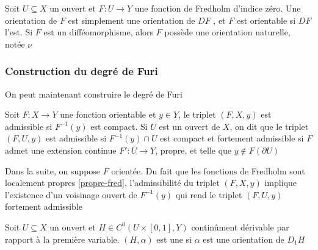 \documentclass[memoire.tex]{subfiles}
\begin{document}
\begin{definition}
    Soit $U\subseteq X$ un ouvert et $F: U\rightarrow Y$ une fonction de Fredholm d'indice zéro. Une \textcolor{color-def}{orientation} de $F$ est simplement une orientation de $DF$ , et $F$ est \textcolor{color-def}{orientable} si $DF$ l'est. Si $F$ est un difféomorphisme, alors $F$ possède une orientation naturelle, notée $\nu$
\end{definition}

\subsubsection{Construction du degré de Furi}

On peut maintenant construire le degré de Furi
\begin{definition}
    Soit $F:X\rightarrow Y$ une fonction orientable et $y\in Y$, le triplet $(F,X,y)$ est 
    \textcolor{color-def}{admissible} si $F^{-1}(y)$ est compact. Si $U$ est un ouvert de $X$, on dit que le triplet $(F,U,y)$ est
    \textcolor{color-def}{admissible} si $F^{-1}(y)\cap U$ est compact et \textcolor{color-def}{fortement admissible } si $F$ admet une extension continue $F':\bar{U}\rightarrow Y$, propre, et telle que $y\notin F(\partial U)$
\end{definition}

Dans la suite, on suppose $F$ orientée. Du fait que les fonctions de Fredholm sont localement propres \ref{propre-fred}, l'admissibilité du triplet $(F,X,y)$ implique l'existence d'un voisinage ouvert de $F^{-1}(y)$ qui rend le triplet $(F,U,y)$ fortement admissible 

\begin{definition}
    Soit $U\subseteq X$ un ouvert et  $H\in C^0(U\times [0,1],Y)$ continûment dérivable par rapport à la première variable. $(H,\alpha)$ est une  si $\alpha$ est une orientation de $D_1 H$
\end{definition}
\end{document}
